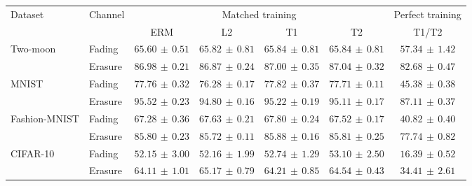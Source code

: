 \begin{tabular*}{\linewidth}{@{\extracolsep{\fill}}llccccc@{}}
\toprule
\multirow{2}{*}{Dataset} & \multirow{2}{*}{Channel} & \multicolumn{4}{c}{Matched training} & Perfect training \\
\cmidrule(lr){3-6}\cmidrule(l){7-7}
 & & ERM & L2 & T1 & T2 & T1/T2 \\
\midrule
\multirow{2}{*}{Two-moon} & Fading & $65.60\,\pm\,0.51$ & $65.82\,\pm\,0.81$ & $\mathbf{65.84}\,\pm\,0.81$ & $65.84\,\pm\,0.81$ & $57.34\,\pm\,1.42$ \\
 & Erasure & $86.98\,\pm\,0.21$ & $86.87\,\pm\,0.24$ & $87.00\,\pm\,0.35$ & $\mathbf{87.04}\,\pm\,0.32$ & $82.68\,\pm\,0.47$ \\
\midrule[0.25pt]
\multirow{2}{*}{MNIST} & Fading & $77.76\,\pm\,0.32$ & $76.28\,\pm\,0.17$ & $\mathbf{77.82}\,\pm\,0.37$ & $77.71\,\pm\,0.11$ & $45.38\,\pm\,0.38$ \\
 & Erasure & $\mathbf{95.52}\,\pm\,0.23$ & $94.80\,\pm\,0.16$ & $95.22\,\pm\,0.19$ & $95.11\,\pm\,0.17$ & $87.11\,\pm\,0.37$ \\
\midrule[0.25pt]
\multirow{2}{*}{Fashion-MNIST} & Fading & $67.28\,\pm\,0.36$ & $67.63\,\pm\,0.21$ & $\mathbf{67.80}\,\pm\,0.24$ & $67.52\,\pm\,0.17$ & $40.82\,\pm\,0.40$ \\
 & Erasure & $85.80\,\pm\,0.23$ & $85.72\,\pm\,0.11$ & $\mathbf{85.88}\,\pm\,0.16$ & $85.81\,\pm\,0.25$ & $77.74\,\pm\,0.82$ \\
\midrule[0.25pt]
\multirow{2}{*}{CIFAR-10} & Fading & $52.15\,\pm\,3.00$ & $52.16\,\pm\,1.99$ & $52.74\,\pm\,1.29$ & $\mathbf{53.10}\,\pm\,2.50$ & $16.39\,\pm\,0.52$ \\
 & Erasure & $64.11\,\pm\,1.01$ & $\mathbf{65.17}\,\pm\,0.79$ & $64.21\,\pm\,0.85$ & $64.54\,\pm\,0.43$ & $34.41\,\pm\,2.61$ \\
\bottomrule
\end{tabular*}
